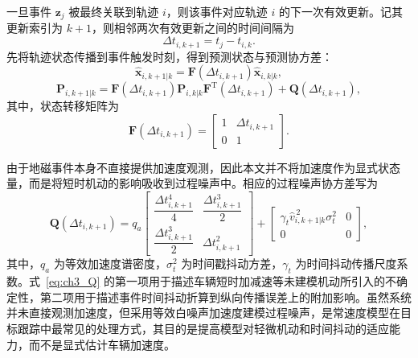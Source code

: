 \documentclass{xdupgthesis}
\begin{document}
一旦事件 $\mathbf z_j$ 被最终关联到轨迹 $i$，则该事件对应轨迹 $i$ 的下一次有效更新。记其更新索引为 $k+1$，则相邻两次有效更新之间的时间间隔为
\begin{equation}
	\Delta t_{i,k+1}=t_j-t_{i,k}.
	\label{eq:ch3_dt_update}
\end{equation}
先将轨迹状态传播到事件触发时刻，得到预测状态与预测协方差：
\begin{equation}
	\hat{\mathbf x}_{i,k+1|k}
	=
	\mathbf F(\Delta t_{i,k+1})\hat{\mathbf x}_{i,k|k},
	\label{eq:ch3_predict_state}
\end{equation}
\begin{equation}
	\mathbf P_{i,k+1|k}
	=
	\mathbf F(\Delta t_{i,k+1})
	\mathbf P_{i,k|k}
	\mathbf F^{\mathrm T}(\Delta t_{i,k+1})
	+
	\mathbf Q(\Delta t_{i,k+1}),
	\label{eq:ch3_predict_cov}
\end{equation}
其中，状态转移矩阵为
\begin{equation}
	\mathbf F(\Delta t_{i,k+1})=
	\begin{bmatrix}
		1 & \Delta t_{i,k+1}\\
		0 & 1
	\end{bmatrix}.
	\label{eq:ch3_F}
\end{equation}

由于地磁事件本身不直接提供加速度观测，因此本文并不将加速度作为显式状态量，而是将短时机动的影响吸收到过程噪声中。相应的过程噪声协方差写为
\begin{equation}
	\mathbf Q(\Delta t_{i,k+1})
	=
	q_a
	\begin{bmatrix}
		\dfrac{\Delta t_{i,k+1}^{4}}{4} & \dfrac{\Delta t_{i,k+1}^{3}}{2}\\[6pt]
		\dfrac{\Delta t_{i,k+1}^{3}}{2} & \Delta t_{i,k+1}^{2}
	\end{bmatrix}
	+
	\begin{bmatrix}
		\gamma_t \hat v_{i,k+1|k}^{\,2}\sigma_t^2 & 0\\
		0 & 0
	\end{bmatrix},
	\label{eq:ch3_Q}
\end{equation}
其中，$q_a$ 为等效加速度谱密度，$\sigma_t^2$ 为时间戳抖动方差，$\gamma_t$ 为时间抖动传播尺度系数。式~\eqref{eq:ch3_Q} 的第一项用于描述车辆短时加减速等未建模机动所引入的不确定性，第二项用于描述事件时间抖动折算到纵向传播误差上的附加影响。虽然系统并未直接观测加速度，但采用等效白噪声加速度建模过程噪声，是常速度模型在目标跟踪中最常见的处理方式，其目的是提高模型对轻微机动和时间抖动的适应能力，而不是显式估计车辆加速度。
\end{document}
